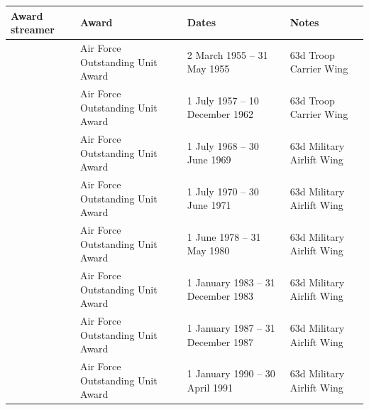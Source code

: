 \documentclass{article}
\begin{document}
\begin{tabular}{llll}
\toprule
Award streamer & Award & Dates & Notes \\
\midrule
 & Air Force Outstanding Unit Award & 2 March 1955 – 31 May 1955 & 63d Troop Carrier Wing \\
 & Air Force Outstanding Unit Award & 1 July 1957 – 10 December 1962 & 63d Troop Carrier Wing \\
 & Air Force Outstanding Unit Award & 1 July 1968 – 30 June 1969 & 63d Military Airlift Wing \\
 & Air Force Outstanding Unit Award & 1 July 1970 – 30 June 1971 & 63d Military Airlift Wing \\
 & Air Force Outstanding Unit Award & 1 June 1978 – 31 May 1980 & 63d Military Airlift Wing \\
 & Air Force Outstanding Unit Award & 1 January 1983 – 31 December 1983 & 63d Military Airlift Wing \\
 & Air Force Outstanding Unit Award & 1 January 1987 – 31 December 1987 & 63d Military Airlift Wing \\
 & Air Force Outstanding Unit Award & 1 January 1990 – 30 April 1991 & 63d Military Airlift Wing \\
\bottomrule
\end{tabular}
\end{document}
